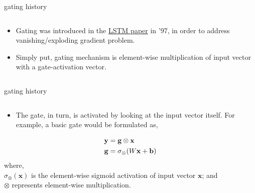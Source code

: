 \documentclass[aspectratio=169,xcolor={dvipsnames,svgnames}]{beamer}
\begin{document}
\begin{frame}[label={sec:gating-history}]{gating history}
\begin{columns}
\begin{column}{0.7\columnwidth}
\begin{itemize}
\item Gating was introduced in the \href{https://ieeexplore.ieee.org/abstract/document/6795963}{LSTM paper} in '97, in
order to address vanishing/exploding gradient
problem.
\item Simply put, gating mechanism is element-wise
multiplication of input vector with a gate-activation
vector.
\end{itemize}
\end{column}
\end{columns}
\end{frame}
\begin{frame}[label={sec:orgc70ac22}]{gating history}
\begin{columns}
\begin{column}{0.7\columnwidth}
\begin{itemize}
\item The gate, in turn, is activated by looking at the
input vector itself.  For example, a basic gate would
be formulated as,
\end{itemize}

\begin{align}
  \notag
  \mathbf{y} &= \mathbf{g} \otimes \mathbf{x} \\
  \notag
  \mathbf{g} &= \sigma_{\otimes}(W\mathbf{x} +
               \mathbf{b}) 
\end{align}
where, \\[0pt]
\(\sigma_{\otimes}(\mathbf{x})\) is the element-wise
sigmoid activation of input vector \(\mathbf{x}\); and \\[0pt]
\(\otimes\) represents element-wise multiplication.
\end{column}
\end{columns}
\end{frame}
\end{document}
